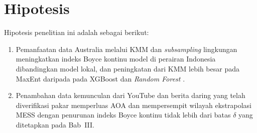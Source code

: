 \section{Hipotesis}

Hipotesis penelitian ini adalah sebagai berikut:

\begin{enumerate}
    \item Pemanfaatan data Australia melalui KMM dan \textit{subsampling}
    lingkungan meningkatkan indeks Boyce kontinu model di perairan Indonesia
    dibandingkan model lokal, dan peningkatan dari KMM lebih besar pada MaxEnt
    daripada pada XGBoost dan \textit{Random Forest} \citep{Lalou2025}.
    \item Penambahan data kemunculan dari YouTube dan berita daring yang telah
    diverifikasi pakar memperluas AOA dan mempersempit wilayah ekstrapolasi
    MESS dengan penurunan indeks Boyce kontinu tidak lebih dari batas
    $\delta$ yang ditetapkan pada Bab~III.
\end{enumerate}
